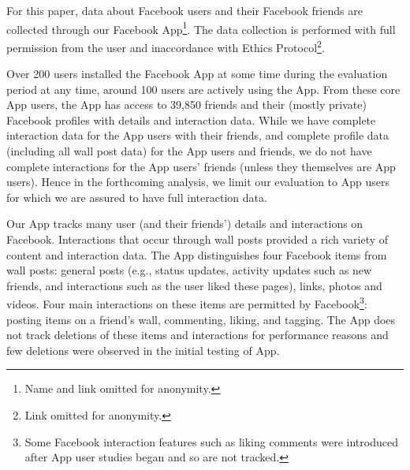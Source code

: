 For this paper, data about Facebook users and their Facebook friends
are collected through our Facebook App\footnote{Name and link omitted
for anonymity.}.  The data collection is performed with full
permission from the user and inaccordance with Ethics
Protocol\footnote{Link omitted for anonymity.}.

Over 200 users installed the Facebook App at some time during the
evaluation period at any time, around 100 users are actively using the
App. From these core App users, the App has access to 39,850 friends
and their (mostly private) Facebook profiles with details and
interaction data.  While we have complete interaction data for the App
users with their friends, and complete profile data (including all
wall post data) for the App users and friends, we do not have complete
interactions for the App users' friends (unless they themselves are
App users).  Hence in the forthcoming analysis, we limit our
evaluation to App users for which we are assured to have full
interaction data.

Our App tracks many user (and their friends') details and interactions on
Facebook. Interactions that occur through wall posts provided a rich
variety of content and interaction data.  The App distinguishes four
Facebook items from wall posts: general posts (e.g., status updates,
activity updates such as new friends, and interactions such as the
user liked these pages), links, photos and videos. Four main
interactions on these items are permitted by Facebook\footnote{Some
Facebook interaction features such as liking comments were introduced
after App user studies began and so are not tracked.}: posting items
on a friend's wall, commenting, liking, and tagging.  The App does not
track deletions of these items and interactions for performance reasons and
few deletions were observed in the initial testing of App.



